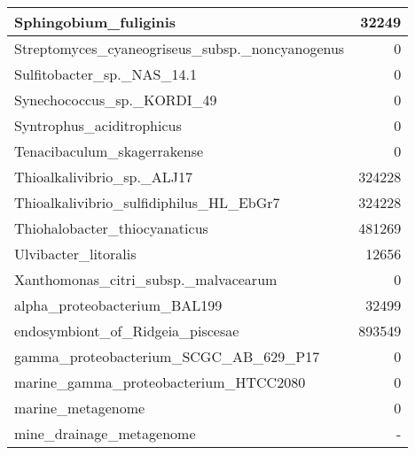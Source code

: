 \documentclass[12pt,a4paper]{article}
\begin{document}
\begin{table}[ht]
\begin{center}
\begin{tabular}{|l*{1}{|r}|}
Sphingobium\_fuliginis & 32249 \\ \hline
Streptomyces\_cyaneogriseus\_subsp.\_noncyanogenus & 0 \\ \hline
Sulfitobacter\_sp.\_NAS\_14.1 & 0 \\ \hline
Synechococcus\_sp.\_KORDI\_49 & 0 \\ \hline
Syntrophus\_aciditrophicus & 0 \\ \hline
Tenacibaculum\_skagerrakense & 0 \\ \hline
Thioalkalivibrio\_sp.\_ALJ17 & 324228 \\ \hline
Thioalkalivibrio\_sulfidiphilus\_HL\_EbGr7 & 324228 \\ \hline
Thiohalobacter\_thiocyanaticus & 481269 \\ \hline
Ulvibacter\_litoralis & 12656 \\ \hline
Xanthomonas\_citri\_subsp.\_malvacearum & 0 \\ \hline
alpha\_proteobacterium\_BAL199 & 32499 \\ \hline
endosymbiont\_of\_Ridgeia\_piscesae & 893549 \\ \hline
gamma\_proteobacterium\_SCGC\_AB\_629\_P17 & 0 \\ \hline
marine\_gamma\_proteobacterium\_HTCC2080 & 0 \\ \hline
marine\_metagenome & 0 \\ \hline
mine\_drainage\_metagenome & - \\ \hline
\end{tabular}
\end{center}
\end{table}
\end{document}
